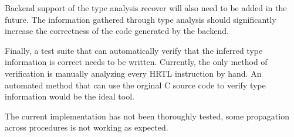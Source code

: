 Backend support of the type analysis recover will also need to be added in the 
future. The information gathered through type analysis should significantly 
increase the correctness of the code generated by the backend.

Finally, a test suite that can automatically verify that the inferred type 
information is correct needs to be written. Currently, the only method of 
verification is manually analyzing every HRTL instruction by hand. An 
automated method that can use the orginal C source code to verify type 
information would be the ideal tool.

The current implementation has not been thoroughly tested, some 
propagation across procedures is not working as expected. 


